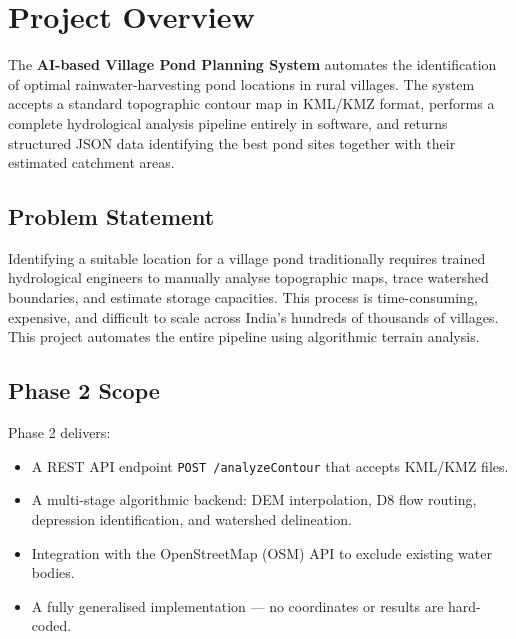 \documentclass[12pt,a4paper]{article}
\begin{document}
\tableofcontents
\newpage

\section{Project Overview}

The \textbf{AI-based Village Pond Planning System} automates the identification of
optimal rainwater-harvesting pond locations in rural villages. The system accepts a
standard topographic contour map in KML/KMZ format, performs a complete hydrological
analysis pipeline entirely in software, and returns structured JSON data identifying the
best pond sites together with their estimated catchment areas.

\subsection{Problem Statement}
Identifying a suitable location for a village pond traditionally requires trained
hydrological engineers to manually analyse topographic maps, trace watershed boundaries,
and estimate storage capacities. This process is time-consuming, expensive, and
difficult to scale across India's hundreds of thousands of villages. This project
automates the entire pipeline using algorithmic terrain analysis.

\subsection{Phase 2 Scope}
Phase 2 delivers:
\begin{itemize}
    \item A REST API endpoint \texttt{POST /analyzeContour} that accepts KML/KMZ files.
    \item A multi-stage algorithmic backend: DEM interpolation, D8 flow routing,
          depression identification, and watershed delineation.
    \item Integration with the OpenStreetMap (OSM) API to exclude existing water bodies.
    \item A fully generalised implementation --- no coordinates or results are hard-coded.
\end{itemize}
\end{document}
